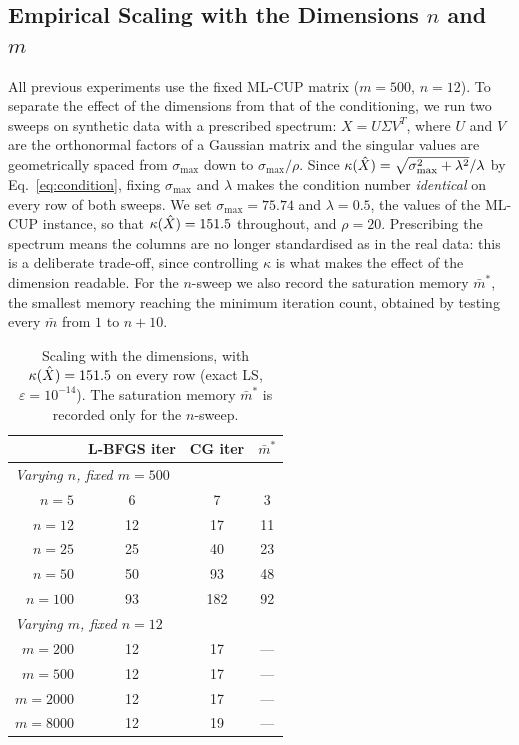 \subsection{Empirical Scaling with the Dimensions $n$ and $m$}
\label{sec:exp_scaling_nm}

\noindent All previous experiments use the fixed ML-CUP matrix ($m = 500$,
$n = 12$). To separate the effect of the dimensions from that of the
conditioning, we run two sweeps on synthetic data with a prescribed spectrum:
$X = U \Sigma V^T$, where $U$ and $V$ are the orthonormal factors of a
Gaussian matrix and the singular values are geometrically spaced from
$\sigma_{\max}$ down to $\sigma_{\max}/\rho$. Since
$\kappa(\hat{X}) = \sqrt{\sigma_{\max}^2 + \lambda^2}/\lambda$ by
Eq.~\eqref{eq:condition}, fixing $\sigma_{\max}$ and $\lambda$ makes the
condition number \emph{identical} on every row of both sweeps. We set
$\sigma_{\max} = 75.74$ and $\lambda = 0.5$, the values of the ML-CUP
instance, so that $\kappa(\hat{X}) = 151.5$ throughout, and $\rho = 20$.
Prescribing the spectrum means the columns are no longer standardised as in
the real data: this is a deliberate trade-off, since controlling $\kappa$ is
what makes the effect of the dimension readable. For the $n$-sweep we also
record the saturation memory $\bar m^*$, the smallest memory reaching the
minimum iteration count, obtained by testing every $\bar m$ from $1$ to
$n + 10$.

\begin{table}[H]
\centering
\caption{Scaling with the dimensions, with $\kappa(\hat{X}) = 151.5$ on every
  row (exact LS, $\varepsilon = 10^{-14}$). The saturation memory
  $\bar m^*$ is recorded only for the $n$-sweep.}
\label{tab:scaling_nm}
\small
\setlength{\tabcolsep}{12pt}
\begin{tabular}{rccc}
    \toprule
    & \textbf{L-BFGS iter} & \textbf{CG iter} & $\bar{m}^*$ \\
    \midrule
    \multicolumn{4}{l}{\emph{Varying $n$, fixed $m = 500$}} \\
    $n = 5$   & 6  & 7   & 3  \\
    $n = 12$  & 12 & 17  & 11 \\
    $n = 25$  & 25 & 40  & 23 \\
    $n = 50$  & 50 & 93  & 48 \\
    $n = 100$ & 93 & 182 & 92 \\
    \midrule
    \multicolumn{4}{l}{\emph{Varying $m$, fixed $n = 12$}} \\
    $m = 200$  & 12 & 17 & --- \\
    $m = 500$  & 12 & 17 & --- \\
    $m = 2000$ & 12 & 17 & --- \\
    $m = 8000$ & 12 & 19 & --- \\
    \bottomrule
\end{tabular}
\end{table}

